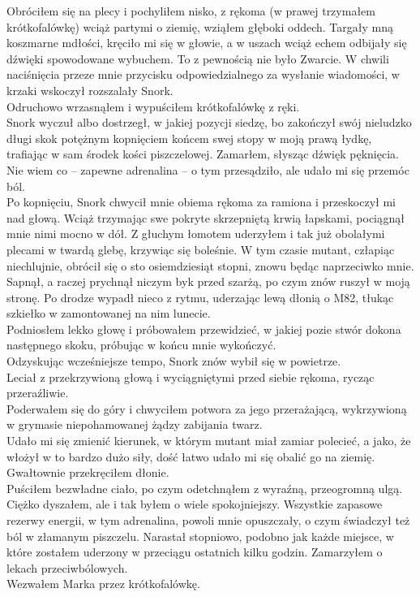 \documentclass[../MAIN.tex]{subfiles}
\begin{document}
Obróciłem się na plecy i pochyliłem nisko, z rękoma (w prawej trzymałem krótkofalówkę) wciąż partymi o ziemię, wziąłem głęboki oddech. Targały mną koszmarne mdłości, kręciło mi się w głowie, a w uszach wciąż echem odbijały się dźwięki spowodowane wybuchem. To z pewnością nie było Zwarcie. W chwili naciśnięcia przeze mnie przycisku odpowiedzialnego za wysłanie wiadomości, w krzaki wskoczył rozszalały Snork.\\
Odruchowo wrzasnąłem i wypuściłem krótkofalówkę z ręki.\\
Snork wyczuł albo dostrzegł, w jakiej pozycji siedzę, bo zakończył swój nieludzko długi skok potężnym kopnięciem końcem swej stopy w moją prawą łydkę, trafiając w sam środek kości piszczelowej. Zamarłem, słysząc dźwięk pęknięcia. Nie wiem co -- zapewne adrenalina -- o tym przesądziło, ale udało mi się przemóc ból.\\
Po kopnięciu, Snork chwycił mnie obiema rękoma za ramiona i przeskoczył mi nad głową. Wciąż trzymając swe pokryte skrzepniętą krwią łapskami, pociągnął mnie nimi mocno w dół. Z głuchym łomotem uderzyłem i tak już obolałymi plecami w twardą glebę, krzywiąc się boleśnie. W tym czasie mutant, człapiąc niechlujnie, obrócił się o sto osiemdziesiąt stopni, znowu będąc naprzeciwko mnie. Sapnął, a raczej prychnął niczym byk przed szarżą, po czym znów ruszył w moją stronę. Po drodze wypadł nieco z rytmu, uderzając lewą dłonią o M82, tłukąc szkiełko w zamontowanej na nim lunecie.\\
Podniosłem lekko głowę i próbowałem przewidzieć, w jakiej pozie stwór dokona następnego skoku, próbując w końcu mnie wykończyć.\\
Odzyskując wcześniejsze tempo, Snork znów wybił się w powietrze.\\
Leciał z przekrzywioną głową i wyciągniętymi przed siebie rękoma, rycząc przeraźliwie.\\
Poderwałem się do góry i chwyciłem potwora za jego przerażającą, wykrzywioną w grymasie niepohamowanej żądzy zabijania twarz.\\
Udało mi się zmienić kierunek, w którym mutant miał zamiar polecieć, a jako, że włożył w to bardzo dużo siły, dość łatwo udało mi się obalić go na ziemię. Gwałtownie przekręciłem dłonie.\\
Puściłem bezwładne ciało, po czym odetchnąłem z wyraźną, przeogromną ulgą. Ciężko dyszałem, ale i tak byłem o wiele spokojniejszy. Wszystkie zapasowe rezerwy energii, w tym adrenalina, powoli mnie opuszczały, o czym świadczył też ból w złamanym piszczelu. Narastał stopniowo, podobno jak każde miejsce, w które zostałem uderzony w przeciągu ostatnich kilku godzin. Zamarzyłem o lekach przeciwbólowych.\\
Wezwałem Marka przez krótkofalówkę.
\end{document}

